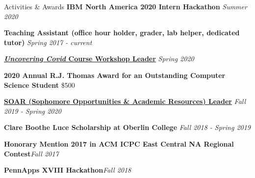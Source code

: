 \documentclass{resume}
\begin{document}
\begin{rSection}{Activities \& Awards}
{\bf IBM North America 2020 Intern Hackathon} \hfill {\em Summer 2020} 

{\bf Teaching Assistant (office hour holder, grader, lab helper, dedicated tutor)} \hfill {\em Spring 2017 - current} 




{\bf \href{https://www.oberlin.edu/admissions-and-aid/for-accepted-students/virtual-visits/covid-19-course}{\textit{Uncovering Covid} Course Workshop Leader}} \hfill{\em Spring 2020} 

{\bf 2020 Annual R.J. Thomas Award for an Outstanding Computer Science Student} \hfill{\$500} 

{\bf \href{https://www.oberlin.edu/career/set/soar/soar-leaders}{SOAR (Sophomore Opportunities \& Academic Resources) Leader}} \hfill{\em Fall 2019 - Spring 2020} 


{\bf Clare Boothe Luce Scholarship at Oberlin College} \hfill{\em Fall 2018 - Spring 2019}


{\bf Honorary Mention 2017 in ACM ICPC East Central NA Regional Contest}\hfill{\em Fall 2017}


{\bf PennApps XVIII Hackathon}\hfill{\em Fall 2018}
\end{rSection}
\end{document}
